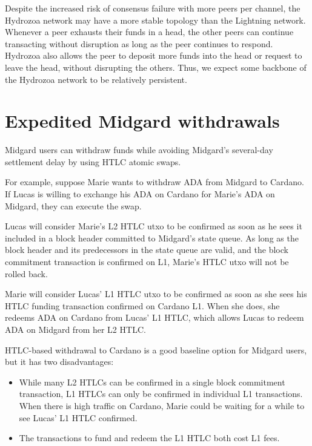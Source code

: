 \documentclass[11pt,a4paper,oneside]{article}
\begin{document}
\begin{multicols}{2}
Despite the increased risk of consensus failure with more peers per channel, the Hydrozoa network may have a more stable topology than the Lightning network.
Whenever a peer exhausts their funds in a head, the other peers can continue transacting without disruption as long as the peer continues to respond.
Hydrozoa also allows the peer to deposit more funds into the head or request to leave the head, without disrupting the others.
Thus, we expect some backbone of the Hydrozoa network to be relatively persistent.

\section{Expedited Midgard withdrawals}%
\label{h:midgard-withdrawals}

Midgard users can withdraw funds while avoiding Midgard's several-day settlement delay by using HTLC atomic swaps.

For example, suppose Marie wants to withdraw ADA from Midgard to Cardano.
If Lucas is willing to exchange his ADA on Cardano for Marie's ADA on Midgard, they can execute the swap.

Lucas will consider Marie's L2 HTLC utxo to be confirmed as soon as he sees it included in a block header committed to Midgard's state queue.
As long as the block header and its predecessors in the state queue are valid, and the block commitment transaction is confirmed on L1, Marie's HTLC utxo will not be rolled back.

Marie will consider Lucas' L1 HTLC utxo to be confirmed as soon as she sees his HTLC funding transaction confirmed on Cardano L1.
When she does, she redeems ADA on Cardano from Lucas' L1 HTLC, which allows Lucas to redeem ADA on Midgard from her L2 HTLC.

HTLC-based withdrawal to Cardano is a good baseline option for Midgard users, but it has two disadvantages:
\begin{itemize}
  \item While many L2 HTLCs can be confirmed in a single block commitment transaction, L1 HTLCs can only be confirmed in individual L1 transactions.
    When there is high traffic on Cardano, Marie could be waiting for a while to see Lucas' L1 HTLC confirmed.
  \item The transactions to fund and redeem the L1 HTLC both cost L1 fees.
\end{itemize}


\end{multicols}
\end{document}
